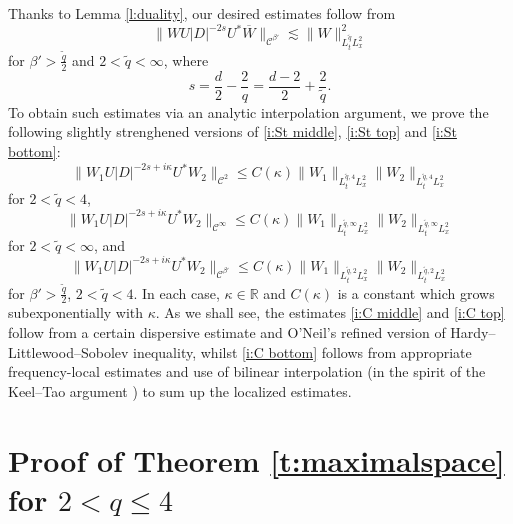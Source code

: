 \documentclass[a4paper]{amsart}
\numberwithin{equation}{section}%
\theoremstyle{plain}%
\theoremstyle{definition}
\theoremstyle{remark}%
\def\C{\mathcal{C}}
\def\C{\mathcal{C}}
\begin{document}
Thanks to Lemma \ref{l:duality}, our desired estimates follow from
\begin{equation}\label{i:main dual}
    \|WU|D|^{-2s}U^*\overline{W}\|_{\C^{\beta'}}
    \lesssim
    \|W\|_{L_t^{\widetilde{q}}L_x^2}^2
\end{equation}
for $\beta'>\frac {\widetilde{q}}{2}$ and $2 < \widetilde{q} < \infty$, where
\[
s=\frac{d}{2}-\frac 2q=\frac{d-2}{2}+\frac{2}{\widetilde{q}}.
\]
To obtain such estimates via an analytic interpolation argument, we prove the following slightly strenghened versions of \eqref{i:St middle}, \eqref{i:St top} and \eqref{i:St bottom}:
\begin{equation}\label{i:C middle}
    \|W_1U|D|^{-2s+i\kappa}U^*W_2\|_{\C^2}
    \leq C(\kappa)
    \|W_1\|_{L_t^{\widetilde{q},4}L_x^2}\|W_2\|_{L_t^{\widetilde{q},4}L_x^2}
\end{equation}
for $2 < \widetilde{q} < 4$,
\begin{equation}\label{i:C top}
    \|W_1U|D|^{-2s+i\kappa}U^*W_2\|_{\C^\infty}
    \leq C(\kappa)
    \|W_1\|_{L_t^{\widetilde{q},\infty}L_x^2}\|W_2\|_{L_t^{\widetilde{q},\infty}L_x^2}
\end{equation}
for $2 < \widetilde{q} < \infty$, and 
\begin{equation}\label{i:C bottom}
    \|W_1U|D|^{-2s+i\kappa}U^*W_2\|_{\C^{\beta'}}
    \leq C(\kappa)
    \|W_1\|_{L_t^{\widetilde{q},2}L_x^2}\|W_2\|_{L_t^{\widetilde{q},2}L_x^2}
\end{equation}
for $\beta'>\frac{\widetilde{q}}{2}$, $2<\widetilde{q}<4$. In each case, $\kappa\in\mathbb R$ and $C(\kappa)$ is a constant which grows subexponentially with $\kappa$. As we shall see, the estimates \eqref{i:C middle} and \eqref{i:C top} follow from a certain dispersive estimate and O'Neil's refined version of Hardy--Littlewood--Sobolev inequality, whilst \eqref{i:C bottom} follows from appropriate frequency-local estimates and use of bilinear interpolation (in the spirit of the Keel--Tao argument \cite{KeelTao}) to sum up the localized estimates.



\section{Proof of Theorem \ref{t:maximalspace} for $2 < q \leq 4$}\label{s:Upper half}
\end{document}
